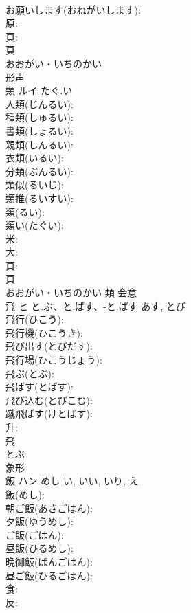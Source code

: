 \documentclass[8pt]{extreport}
\begin{document}
\begin{CJK}{UTF8}{min}
\\	お願いします(おねがいします): 
\\	原: 
\\	頁: 
\\	頁	
\\	おおがい・いちのかい	
\\	形声 
\\	類	ルイ	たぐ.い		
\\	人類(じんるい): 
\\	種類(しゅるい): 
\\	書類(しょるい): 
\\	親類(しんるい): 
\\	衣類(いるい): 
\\	分類(ぶんるい): 
\\	類似(るいじ): 
\\	類推(るいすい): 
\\	類(るい): 
\\	類い(たぐい): 
\\	米: 
\\	大: 
\\	頁: 
\\	頁	
\\	おおがい・いちのかい	類	会意 
\\	飛	ヒ	と.ぶ、と.ばす、-と.ばす	あす, とび	
\\	飛行(ひこう): 
\\	飛行機(ひこうき): 
\\	飛び出す(とびだす): 
\\	飛行場(ひこうじょう): 
\\	飛ぶ(とぶ): 
\\	飛ばす(とばす): 
\\	飛び込む(とびこむ): 
\\	蹴飛ばす(けとばす): 
\\	升: 
\\	飛	
\\	とぶ	
\\	象形 
\\	飯	ハン	めし	い, いい, いり, え	
\\	飯(めし): 
\\	朝ご飯(あさごはん): 
\\	夕飯(ゆうめし): 
\\	ご飯(ごはん): 
\\	昼飯(ひるめし): 
\\	晩御飯(ばんごはん): 
\\	昼ご飯(ひるごはん): 
\\	食: 
\\	反: 

\end{CJK}
\end{document}
